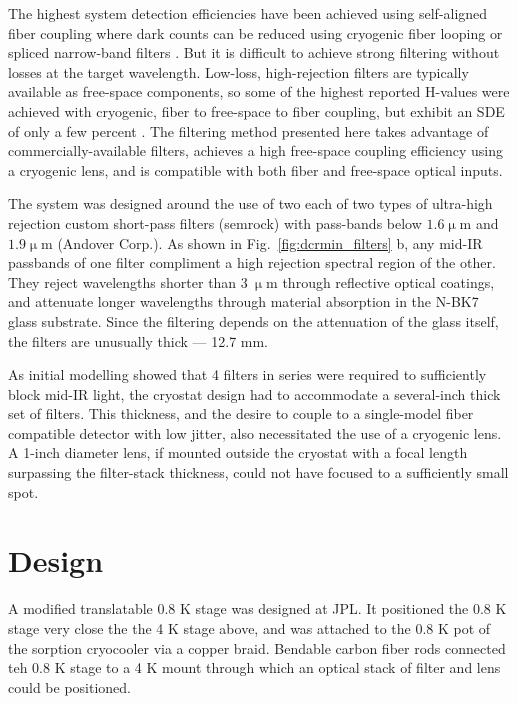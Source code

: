 \documentclass[11pt]{caltech_thesis} %
\begin{document}
The highest system detection efficiencies have been achieved using self-aligned fiber coupling where dark counts can be reduced using cryogenic fiber looping \autocite{Cohen2015} or spliced narrow-band filters \autocite{Boaron2018secure}. But it is difficult to achieve strong filtering without losses at the target wavelength. Low-loss, high-rejection filters are typically available as free-space components, so some of the highest reported H-values were achieved with cryogenic, fiber to free-space to fiber coupling, but exhibit an SDE of only a few percent \autocite{Shibata2015}. The filtering method presented here takes advantage of commercially-available filters, achieves a high free-space coupling efficiency using a cryogenic lens, and is compatible with both fiber and free-space optical inputs.

The system was designed around the use of two each of two types of ultra-high rejection custom short-pass filters (semrock) with pass-bands below $1.6 \mathrm{\upmu m}$ and $1.9 \mathrm{\upmu m}$ (Andover Corp.). As shown in Fig.~\ref{fig:dcrmin_filters} b, any mid-IR passbands of one filter compliment a high rejection spectral region of the other. They reject wavelengths shorter than $3 \ \mathrm{\upmu m}$ through reflective optical coatings, and attenuate longer wavelengths through material absorption in the N-BK7 glass substrate. Since the filtering depends on the attenuation of the glass itself, the filters are unusually thick --- 12.7 mm.

As initial modelling showed that 4 filters in series were required to sufficiently block mid-IR light, the cryostat design had to accommodate a several-inch thick set of filters. This thickness, and the desire to couple to a single-model fiber compatible detector with low jitter, also necessitated the use of a cryogenic lens. A 1-inch diameter lens, if mounted outside the cryostat with a focal length surpassing the filter-stack thickness, could not have focused to a sufficiently small spot.

\hypertarget{design}{%
\section{Design}\label{design}}

A modified translatable 0.8 K stage was designed at JPL. It positioned the 0.8 K stage very close the the 4 K stage above, and was attached to the 0.8 K pot of the sorption cryocooler via a copper braid. Bendable carbon fiber rods connected teh 0.8 K stage to a 4 K mount through which an optical stack of filter and lens could be positioned.
\end{document}
